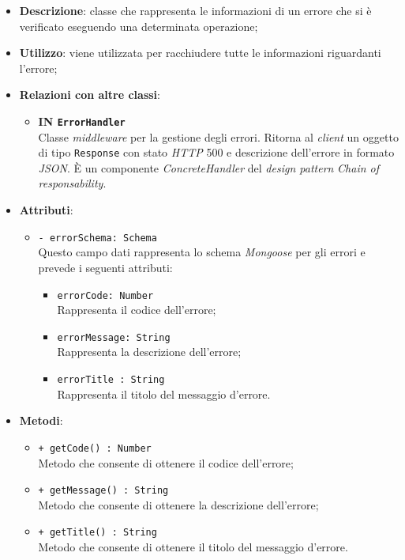 \begin{itemize}
	\item \textbf{Descrizione}: classe che rappresenta le informazioni di un errore che si è verificato eseguendo una determinata operazione;
	\item \textbf{Utilizzo}: viene utilizzata per racchiudere tutte le informazioni riguardanti l'errore;
	\item \textbf{Relazioni con altre classi}:
		\begin{itemize}
			\item \textbf{IN \texttt{ErrorHandler}} \\
			Classe \textit{middleware} per la gestione degli errori. Ritorna al \textit{client} un oggetto di tipo \texttt{Response} con stato \textit{HTTP} 500 e descrizione dell'errore in formato \textit{JSON}. È un componente \textit{ConcreteHandler} del \textit{design pattern} \textit{Chain of responsability}.
		\end{itemize}
	\item \textbf{Attributi}:
		\begin{itemize}
			\item \texttt{- errorSchema: Schema} \\
			Questo campo dati rappresenta lo schema \textit{Mongoose} per gli errori e prevede i seguenti attributi:
				\begin{itemize}
					\item \texttt{errorCode: Number}\\ Rappresenta il codice dell'errore;
					\item \texttt{errorMessage: String}\\ Rappresenta la descrizione dell'errore; 
					\item \texttt{errorTitle	: String}\\ Rappresenta il titolo del messaggio d'errore.
				\end{itemize}
		\end{itemize}
	\item \textbf{Metodi}:
		\begin{itemize}
			\item \texttt{+ getCode() : Number} \\
			Metodo che consente di ottenere il codice dell'errore;
			\item \texttt{+ getMessage() : String} \\
			Metodo che consente di ottenere la descrizione dell'errore;
			\item \texttt{+ getTitle() : String} \\
			Metodo che consente di ottenere il titolo del messaggio d'errore. 
		\end{itemize}
\end{itemize}